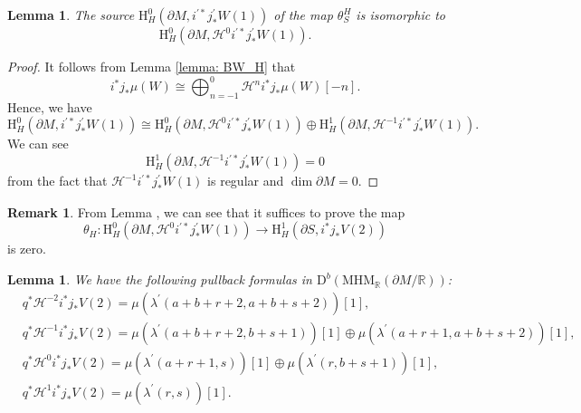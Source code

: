 \documentclass[11pt, a4paper]{amsart}
\theoremstyle{plain}
\newtheorem{lemma}[theorem]{Lemma}
\theoremstyle{definition}
\newtheorem{remark}[theorem]{Remark}
\numberwithin{equation}{section}
\def\RR{\mathbb{R}}
\begin{document}
\begin{lemma}
\label{lemma: Hodge: source of theta}
    The source $\mathrm{H}^{0}_{H}(\partial{M}, i^{\prime*}j^{\prime}_{*}W(1))$ of the map $\theta^{H}_{S}$ is isomorphic to 
    \begin{equation*}
        \mathrm{H}^{0}_{H}(\partial{M}, \mathcal{H}^{0}i^{\prime*}j^{\prime}_{*}W(1)).
    \end{equation*}
\end{lemma}

\begin{proof}
    It follows from Lemma \ref{lemma: BW_H} that 
    \begin{equation*}
        i^{*}j_{*} \mu(W) \cong \bigoplus_{n = -1}^{0} \mathcal{H}^{n}i^{*}j_{*} \mu(W)[-n]. 
    \end{equation*}
    Hence, we have 
    \begin{equation*}
        \mathrm{H}^{0}_{H}(\partial{M}, i^{\prime*}j^{\prime}_{*}W(1)) \cong \mathrm{H}^{0}_{H}(\partial{M}, \mathcal{H}^{0}i^{\prime*}j^{\prime}_{*}W(1)) \oplus \mathrm{H}^{1}_{H}(\partial{M}, \mathcal{H}^{-1}i^{\prime*}j^{\prime}_{*}W(1)). 
    \end{equation*}
    We can see 
    \begin{equation*}
        \mathrm{H}^{1}_{H}(\partial{M}, \mathcal{H}^{-1}i^{\prime*}j^{\prime}_{*}W(1)) = 0 
    \end{equation*}
    from the fact that $\mathcal{H}^{-1}i^{\prime*}j^{\prime}_{*}W(1)$ is regular and $\dim \partial M = 0$. 
\end{proof}
\begin{remark}
    From Lemma \label{lemma: Hodge: source of theta}, we can see that it suffices to prove the map
    \begin{equation*}
        \theta_{H} \colon \mathrm{H}^{0}_{H}(\partial{M}, \mathcal{H}^{0}i^{\prime*}j^{\prime}_{*}W(1)) \rightarrow  \mathrm{H}^{1}_{H}(\partial{S}, i^{*}j_{*}V(2))
    \end{equation*}
    is zero. 
\end{remark}

\begin{lemma}
\label{lemma: pullback of deg of MHS}
    We have the following pullback formulas in $\mathrm{D}^{b}(\mathrm{MHM}_{\RR}(\partial M/\RR))$: 
    \begin{align*}
         & q^{*} \mathcal{H}^{-2}i^{*}j_{*}V(2) = \mu(\lambda^{\prime}(a + b + r + 2, a + b + s + 2))[1],  \\
         & q^{*} \mathcal{H}^{-1}i^{*}j_{*}V(2) = \mu(\lambda^{\prime}(a + b + r + 2, b + s + 1))[1] \oplus \mu(\lambda^{\prime}(a + r + 1, a + b + s + 2))[1], \\
         & q^{*} \mathcal{H}^{0}i^{*}j_{*}V(2) = \mu(\lambda^{\prime}(a + r + 1 , s))[1] \oplus \mu(\lambda^{\prime}(r, b + s + 1))[1], \\
         & q^{*} \mathcal{H}^{1}i^{*}j_{*}V(2) = \mu(\lambda^{\prime}(r, s))[1]. 
    \end{align*}
\end{lemma}
\end{document}
